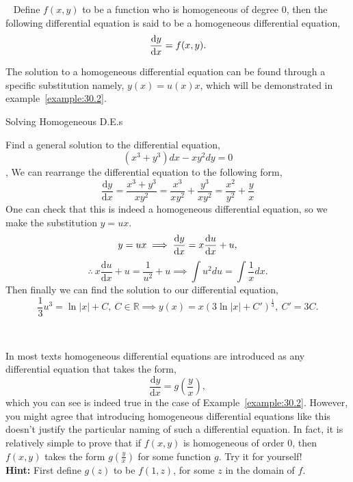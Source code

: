 \documentclass[../../main.tex]{subfiles}
\begin{document}
\begin{definition}{~}\label{definition:30.2}
Define $f(x,y)$ to be a function who is homogeneous of degree $0$, then the following differential equation is said to be a homogeneous differential equation,
$$\dv{y}{x}=f(x,y).$$
\end{definition}

The solution to a homogeneous differential equation can be found through a specific substitution namely, $y(x)=u(x)x$, which will be demonstrated in example~\ref{example:30.2}.

\begin{example}{Solving Homogeneous D.E.s}\label{example:30.2}

Find a general solution to the differential equation,
$$(x^3+y^3)dx-xy^2dy=0$$
\sep
We can rearrange the differential equation to the following form,
$$\frac{\mathrm{d}y}{\mathrm{d}x}=\frac{x^3+y^3}{xy^2}=\frac{x^3}{xy^2}+\frac{y^3}{xy^2}=\frac{x^2}{y^2}+\frac{y}{x}$$
One can check that this is indeed a homogeneous differential equation, so we make the substitution $y=ux$.
$$y=ux \implies \dv{y}{x}=x\dv{u}{x}+u,$$
$$\therefore \ x\frac{\mathrm{d}u}{\mathrm{d}x}+u=\frac{1}{u^2}+u \implies \int u^2 du=\int \frac{1}{x} dx.$$
Then finally we can find the solution to our differential equation,
$$\frac{1}{3}u^3= \ln|x|+C, \ C \in \mathbb{R} \implies y(x)=x \left(3 \ln|x|+C' \right)^\frac{1}{3}, \ C'=3C.$$
\end{example}
\begin{insight}{~}

In most texts homogeneous differential equations are introduced as any differential equation that takes the form,
$$\frac{\mathrm{d}y}{\mathrm{d}x}=g\left(\frac{y}{x}\right),$$
which you can see is indeed true in the case of Example~\ref{example:30.2}. However, you might agree that introducing homogeneous differential equations like this doesn't justify the particular naming of such a differential equation. In fact, it is relatively simple to prove that if $f(x,y)$ is homogeneous of order $0$, then $f(x,y)$ takes the form $g\left(\frac{y}{x}\right)$ for some function $g$. Try it for yourself! \\
\textbf{Hint:} First define $g(z)$ to be $f(1,z)$, for some $z$ in the domain of $f$.

\end{insight}

\newpage
\end{document}
